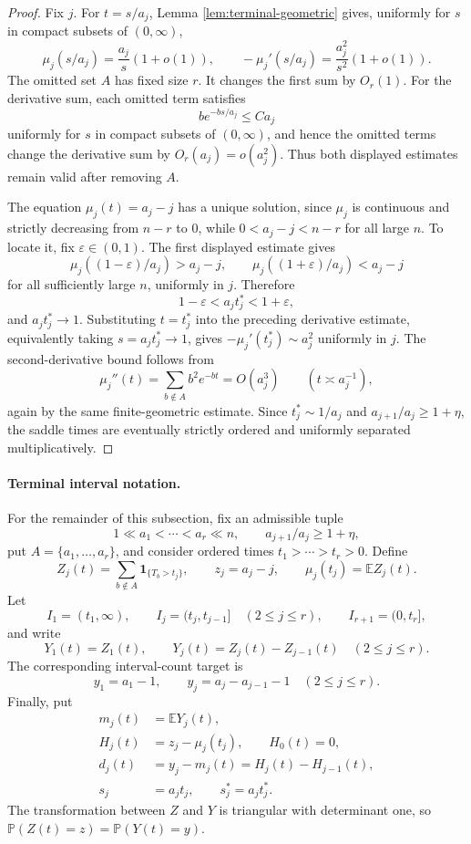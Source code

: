 \documentclass[11pt]{article}
\theoremstyle{remark}
\newcommand{\Pp}{\mathbb P}
\newcommand{\Ee}{\mathbb E}
\newcommand{\one}{\mathbf 1}
\begin{document}
\begin{proof}
Fix \(j\).  For \(t=s/a_j\), Lemma \ref{lem:terminal-geometric} gives, uniformly for \(s\) in compact subsets of \((0,\infty)\),
\[
        \mu_j(s/a_j)=\frac{a_j}{s}(1+o(1)),
        \qquad
        -\mu_j'(s/a_j)=\frac{a_j^2}{s^2}(1+o(1)).
\]
The omitted set \(A\) has fixed size \(r\).  It changes the first sum by \(O_r(1)\).  For the derivative sum, each omitted term satisfies
\[
        b e^{-bs/a_j}\le C a_j
\]
uniformly for \(s\) in compact subsets of \((0,\infty)\), and hence the omitted terms change the derivative sum by \(O_r(a_j)=o(a_j^2)\).  Thus both displayed estimates remain valid after removing \(A\).

The equation \(\mu_j(t)=a_j-j\) has a unique solution, since \(\mu_j\) is continuous and strictly decreasing from \(n-r\) to \(0\), while \(0<a_j-j<n-r\) for all large \(n\).  To locate it, fix \(\varepsilon\in(0,1)\).  The first displayed estimate gives
\[
        \mu_j((1-\varepsilon)/a_j)>a_j-j,
        \qquad
        \mu_j((1+\varepsilon)/a_j)<a_j-j
\]
for all sufficiently large \(n\), uniformly in \(j\).  Therefore
\[
        1-\varepsilon<a_jt_j^*<1+\varepsilon,
\]
and \(a_jt_j^*\to1\).  Substituting \(t=t_j^*\) into the preceding derivative estimate, equivalently taking \(s=a_jt_j^*\to1\), gives \(-\mu_j'(t_j^*)\sim a_j^2\) uniformly in \(j\).  The second-derivative bound follows from
\[
        \mu_j''(t)=\sum_{b\notin A}b^2e^{-bt}=O(a_j^3)
        \qquad(t\asymp a_j^{-1}),
\]
again by the same finite-geometric estimate.  Since \(t_j^*\sim1/a_j\) and \(a_{j+1}/a_j\ge1+\eta\), the saddle times are eventually strictly ordered and uniformly separated multiplicatively.
\end{proof}

\paragraph{Terminal interval notation.}
For the remainder of this subsection, fix an admissible tuple
\[
        1\ll a_1<\cdots<a_r\ll n,
        \qquad a_{j+1}/a_j\ge1+\eta,
\]
put \(A=\{a_1,\ldots,a_r\}\), and consider ordered times
\(t_1>\cdots>t_r>0\).  Define
\[
        Z_j(t)=\sum_{b\notin A}\one_{\{T_b>t_j\}},
        \qquad z_j=a_j-j,
        \qquad \mu_j(t_j)=\Ee Z_j(t).
\]
Let
\[
        I_1=(t_1,\infty),\qquad
        I_j=(t_j,t_{j-1}]\quad(2\le j\le r),\qquad
        I_{r+1}=(0,t_r],
\]
and write
\[
        Y_1(t)=Z_1(t),\qquad
        Y_j(t)=Z_j(t)-Z_{j-1}(t)\quad(2\le j\le r).
\]
The corresponding interval-count target is
\[
        y_1=a_1-1,
        \qquad
        y_j=a_j-a_{j-1}-1\quad(2\le j\le r).
\]
Finally, put
\[
\begin{aligned}
        m_j(t)&=\Ee Y_j(t),\\
        H_j(t)&=z_j-\mu_j(t_j),\qquad H_0(t)=0,\\
        d_j(t)&=y_j-m_j(t)=H_j(t)-H_{j-1}(t),\\
        s_j&=a_jt_j,\qquad s_j^*=a_jt_j^*.
\end{aligned}
\]
The transformation between \(Z\) and \(Y\) is triangular with determinant
one, so \(\Pp(Z(t)=z)=\Pp(Y(t)=y)\).
\end{document}
